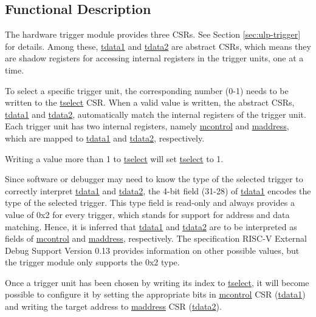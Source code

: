 \documentclass[main\_\_EN.tex]{subfiles}
\begin{document}
\subsection{Functional Description}
\label{sec:ulp-hwt-func-descr}

The hardware trigger module provides three CSRs. See Section \ref{sec:ulp-trigger} for details. Among these, \hyperref[regdesc:LPTDATA1]{tdata1} and \hyperref[regdesc:LPTDATA2]{tdata2} are abstract CSRs, which means they are shadow registers for accessing internal registers in the trigger units, one at a time.

To select a specific trigger unit, the corresponding number (0-1) needs to be written to the \hyperref[regdesc:LPTSELECT]{tselect} CSR. When a valid value is written, the abstract CSRs, \hyperref[regdesc:LPTDATA1]{tdata1} and \hyperref[regdesc:LPTDATA2]{tdata2}, automatically match the internal registers of the trigger unit. Each trigger unit has two internal registers, namely \hyperref[regdesc:LPMCONTROL]{mcontrol} and \hyperref[regdesc:LPMADDRESS]{maddress}, which are mapped to \hyperref[regdesc:LPTDATA1]{tdata1} and \hyperref[regdesc:LPTDATA2]{tdata2}, respectively.

Writing a value more than 1 to \hyperref[regdesc:LPTSELECT]{tselect} will set \hyperref[regdesc:LPTSELECT]{tselect} to 1.

Since software or debugger may need to know the type of the selected trigger to correctly interpret \hyperref[regdesc:LPTDATA1]{tdata1} and \hyperref[regdesc:LPTDATA2]{tdata2}, the 4-bit field (31-28) of \hyperref[regdesc:LPTDATA1]{tdata1} encodes the type of the selected trigger. This type field is read-only and always provides a value of 0x2 for every trigger, which stands for support for address and data matching. Hence, it is inferred that \hyperref[regdesc:LPTDATA1]{tdata1} and \hyperref[regdesc:LPTDATA2]{tdata2} are to be interpreted as fields of \hyperref[regdesc:LPMCONTROL]{mcontrol} and \hyperref[regdesc:LPMADDRESS]{maddress}, respectively. The specification RISC-V External Debug Support Version 0.13 provides information on other possible values, but the trigger module only supports the 0x2 type.

Once a trigger unit has been chosen by writing its index to \hyperref[regdesc:LPTSELECT]{tselect}, it will become possible to configure it by setting the appropriate bits in \hyperref[regdesc:LPMCONTROL]{mcontrol} CSR (\hyperref[regdesc:LPTDATA1]{tdata1}) and writing the target address to \hyperref[regdesc:LPMADDRESS]{maddress} CSR (\hyperref[regdesc:LPTDATA2]{tdata2}).
\end{document}
